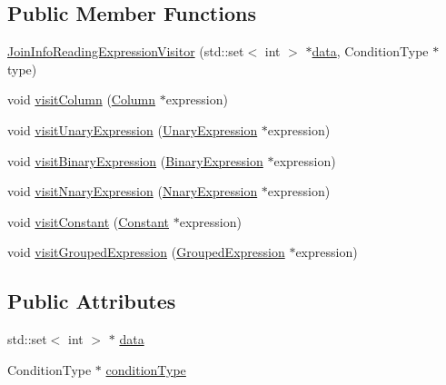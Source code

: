 \subsection*{Public Member Functions}
\begin{DoxyCompactItemize}
\item 
\hyperlink{classrafe_1_1_join_info_reading_expression_visitor_a964f1d36e020a9099314400c1b400754}{Join\+Info\+Reading\+Expression\+Visitor} (std\+::set$<$ int $>$ $\ast$\hyperlink{classrafe_1_1_join_info_reading_expression_visitor_a9e734526bd1f92d980024ce0dbed65ba}{data}, Condition\+Type $\ast$type)
\item 
void \hyperlink{classrafe_1_1_join_info_reading_expression_visitor_a791b1f98544255f24c39b77286b459d9}{visit\+Column} (\hyperlink{classrafe_1_1_column}{Column} $\ast$expression)
\item 
void \hyperlink{classrafe_1_1_join_info_reading_expression_visitor_a27ebab51d1b63683004f2ec45d15869f}{visit\+Unary\+Expression} (\hyperlink{classrafe_1_1_unary_expression}{Unary\+Expression} $\ast$expression)
\item 
void \hyperlink{classrafe_1_1_join_info_reading_expression_visitor_a3fe9a23de3b525cc967c0f8b1c2c81eb}{visit\+Binary\+Expression} (\hyperlink{classrafe_1_1_binary_expression}{Binary\+Expression} $\ast$expression)
\item 
void \hyperlink{classrafe_1_1_join_info_reading_expression_visitor_a57a8dedf4fa06ff27c71cf36ee7a4b3b}{visit\+Nnary\+Expression} (\hyperlink{classrafe_1_1_nnary_expression}{Nnary\+Expression} $\ast$expression)
\item 
void \hyperlink{classrafe_1_1_join_info_reading_expression_visitor_aa08dee45829be99a6c6b3961c8cf081d}{visit\+Constant} (\hyperlink{classrafe_1_1_constant}{Constant} $\ast$expression)
\item 
void \hyperlink{classrafe_1_1_join_info_reading_expression_visitor_acfd9c7c62dfac50b0ac6d1c314f7f395}{visit\+Grouped\+Expression} (\hyperlink{classrafe_1_1_grouped_expression}{Grouped\+Expression} $\ast$expression)
\end{DoxyCompactItemize}
\subsection*{Public Attributes}
\begin{DoxyCompactItemize}
\item 
std\+::set$<$ int $>$ $\ast$ \hyperlink{classrafe_1_1_join_info_reading_expression_visitor_a9e734526bd1f92d980024ce0dbed65ba}{data}
\item 
Condition\+Type $\ast$ \hyperlink{classrafe_1_1_join_info_reading_expression_visitor_a76585d743cb5babfeca7bd239bc01fca}{condition\+Type}
\end{DoxyCompactItemize}


